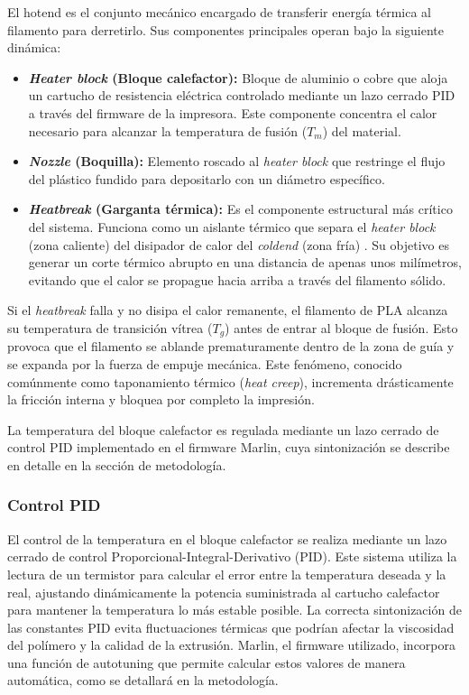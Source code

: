 El hotend es el conjunto mecánico encargado de transferir energía térmica al filamento para derretirlo. Sus componentes principales operan bajo la siguiente dinámica:

\begin{itemize}
    \item \textbf{\textit{Heater block} (Bloque calefactor):} Bloque de aluminio o cobre que aloja un cartucho de resistencia eléctrica controlado mediante un lazo cerrado PID a través del firmware de la impresora. Este componente concentra el calor necesario para alcanzar la temperatura de fusión ($T_m$) del material.
    \item \textbf{\textit{Nozzle} (Boquilla):} Elemento roscado al \textit{heater block} que restringe el flujo del plástico fundido para depositarlo con un diámetro específico.
    \item \textbf{\textit{Heatbreak} (Garganta térmica):} Es el componente estructural más crítico del sistema. Funciona como un aislante térmico que separa el \textit{heater block} (zona caliente) del disipador de calor del \textit{coldend} (zona fría) \cite{salazar2024}. Su objetivo es generar un corte térmico abrupto en una distancia de apenas unos milímetros, evitando que el calor se propague hacia arriba a través del filamento sólido.
\end{itemize}

Si el \textit{heatbreak} falla y no disipa el calor remanente, el filamento de PLA alcanza su temperatura de transición vítrea ($T_g$) antes de entrar al bloque de fusión. Esto provoca que el filamento se ablande prematuramente dentro de la zona de guía y se expanda por la fuerza de empuje mecánica. Este fenómeno, conocido comúnmente como taponamiento térmico (\textit{heat creep}), incrementa drásticamente la fricción interna y bloquea por completo la impresión.

La temperatura del bloque calefactor es regulada mediante un lazo cerrado de control PID implementado en el firmware Marlin, cuya sintonización se describe en detalle en la sección de metodología.

\subsubsection{Control PID}

El control de la temperatura en el bloque calefactor se realiza mediante un 
lazo cerrado de control Proporcional-Integral-Derivativo (PID). Este sistema 
utiliza la lectura de un termistor para calcular el error entre la temperatura 
deseada y la real, ajustando dinámicamente la potencia suministrada al 
cartucho calefactor para mantener la temperatura lo más estable posible. La 
correcta sintonización de las constantes PID evita fluctuaciones térmicas que 
podrían afectar la viscosidad del polímero y la calidad de la extrusión. 
Marlin, el firmware utilizado, incorpora una función de autotuning que permite 
calcular estos valores de manera automática, como se detallará en la 
metodología.


